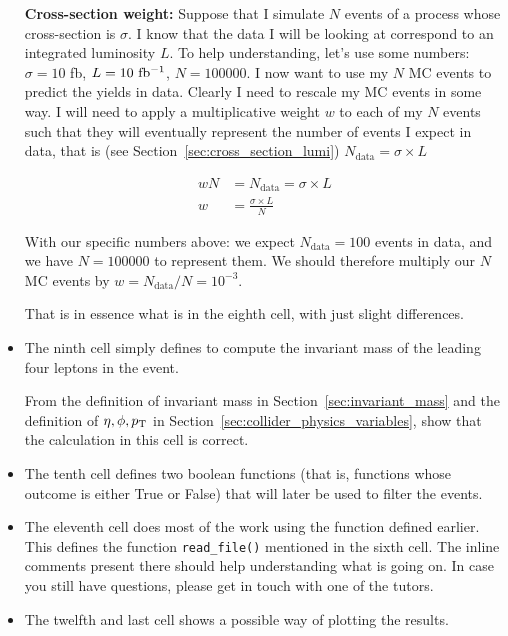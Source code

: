 \begin{itemize}
\begin{mybox}
\textbf{Cross-section weight:} Suppose that I simulate $N$ events of a process whose cross-section is $\sigma$. I know that the data I will be looking at correspond to an integrated luminosity $L$. To help understanding, let's use some numbers: $\sigma = 10$ fb, $L = 10\ \mbox{fb\(^{-1}\)}$, $N = 100000$. I now want to use my $N$ MC events to predict the yields in data. Clearly I need to rescale my MC events in some way. I will need to apply a multiplicative weight $w$ to each of my $N$ events such that they will eventually represent the number of events I expect in data, that is (see Section~\ref{sec:cross_section_lumi}) $N_{\mathrm{data}} = \sigma \times L$

\begin{align*} 
wN &= N_{\mathrm{data}} = \sigma \times L \\ 
w &= \frac{\sigma \times L}{N}
\end{align*} 

With our specific numbers above: we expect $N_{\mathrm{data}} = 100$ events in data, and we have $N = 100000$ to represent them. We should therefore multiply our $N$ MC events by $w = N_{\mathrm{data}}/N = 10^{-3}$. 
\end{mybox}

That is in essence what is in the eighth cell, with just slight differences. 

\item The ninth cell simply defines to compute the invariant mass of the leading four leptons in the event. 

\begin{mybox}
\begin{ExerciseList}
\Exercise From the definition of invariant mass in Section~\ref{sec:invariant_mass} and the definition of $\eta, \phi, p_{\mathrm{T}}$ in Section~\ref{sec:collider_physics_variables}, show that the calculation in this cell is correct. 
\end{ExerciseList}
\end{mybox}

\item The tenth cell defines two boolean functions (that is, functions whose outcome is either True or False) that will later be used to filter the events. 
\item The eleventh cell does most of the work using the function defined earlier. This defines the function \verb|read_file()| mentioned in the sixth cell. The inline comments present there should help understanding what is going on. In case you still have questions, please get in touch with one of the tutors. 
\item The twelfth and last cell shows a possible way of plotting the results. 
\end{itemize}


